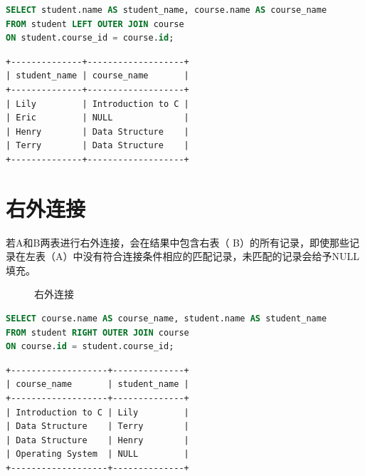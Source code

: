 \documentclass[12pt, openany, oneside]{book}
\begin{document}

\begin{lstlisting}[language=SQL]
SELECT student.name AS student_name, course.name AS course_name
FROM student LEFT OUTER JOIN course
ON student.course_id = course.id;
\end{lstlisting}

\begin{tcolorbox}
    \begin{verbatim}
+--------------+-------------------+
| student_name | course_name       |
+--------------+-------------------+
| Lily         | Introduction to C |
| Eric         | NULL              |
| Henry        | Data Structure    |
| Terry        | Data Structure    |
+--------------+-------------------+
	\end{verbatim}
\end{tcolorbox}

\section{右外连接}

若A和B两表进行右外连接，会在结果中包含右表（ B）的所有记录，即使那些记录在左表（A）中没有符合连接条件相应的匹配记录，未匹配的记录会给予NULL填充。 \\

\begin{figure}[H]
    \centering
    \caption{右外连接}
\end{figure}


\begin{lstlisting}[language=SQL]
SELECT course.name AS course_name, student.name AS student_name
FROM student RIGHT OUTER JOIN course
ON course.id = student.course_id;
\end{lstlisting}

\begin{tcolorbox}
    \begin{verbatim}
+-------------------+--------------+
| course_name       | student_name |
+-------------------+--------------+
| Introduction to C | Lily         |
| Data Structure    | Terry        |
| Data Structure    | Henry        |
| Operating System  | NULL         |
+-------------------+--------------+
	\end{verbatim}
\end{tcolorbox}
\end{document}
